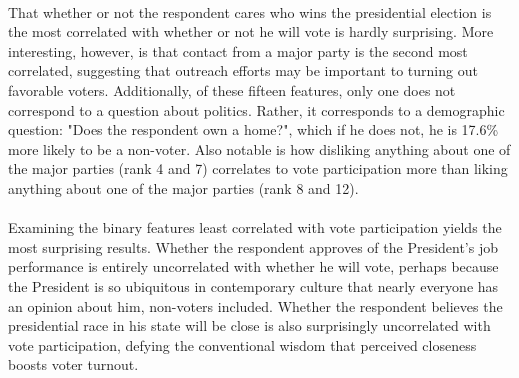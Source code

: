 \documentclass{article}
\begin{document}
	\hfill \\
	That whether or not the respondent cares who wins the presidential election is the most correlated with whether or not he will vote is hardly surprising. More interesting, however, is that contact from a major party is the second most correlated, suggesting that outreach efforts may be important to turning out favorable voters. Additionally, of these fifteen features, only one does not correspond to a question about politics. Rather, it corresponds to a demographic question: "Does the respondent own a home?", which if he does not, he is 17.6\% more likely to be a non-voter. Also notable is how disliking anything about one of the major parties (rank 4 and 7) correlates to vote participation more than liking anything about one of the major parties (rank 8 and 12).
	\\\\
	Examining the binary features least correlated with vote participation yields the most surprising results. Whether the respondent approves of the President's job performance is entirely uncorrelated with whether he will vote, perhaps because the President is so ubiquitous in contemporary culture that nearly everyone has an opinion about him, non-voters included. Whether the respondent believes the presidential race in his state will be close is also surprisingly uncorrelated with vote participation, defying the conventional wisdom that perceived closeness boosts voter turnout.
\end{document}
